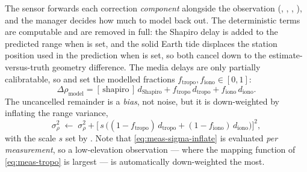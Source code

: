 The sensor forwards each correction \emph{component} alongside the observation
(, , ,
), and the manager decides how much to model back out. The
deterministic terms are computable and are removed in full: the Shapiro delay
is added to the predicted range when  is set, and the
solid Earth tide displaces the station position used in the prediction when
 is set, so both cancel down to the
estimate-versus-truth geometry difference. The media delays are only partially
calibratable, so  and
 set the modelled fractions
$f_\mathrm{tropo}, f_\mathrm{iono} \in [0,1]$:
\begin{equation}
  \Delta\rho_\mathrm{model}
  = [\,\text{shapiro}\,]\,d_\mathrm{Shapiro}
  + f_\mathrm{tropo}\,d_\mathrm{tropo}
  + f_\mathrm{iono}\,d_\mathrm{iono} .
  \label{eq:meas-model-corr}
\end{equation}
The uncancelled remainder is a \emph{bias}, not noise, but it is
down-weighted by inflating the range variance,
\begin{equation}
  \sigma_\rho^2 \;\leftarrow\; \sigma_\rho^2
  + \Big[\,s\,\big((1 - f_\mathrm{tropo})\,d_\mathrm{tropo}
      + (1 - f_\mathrm{iono})\,d_\mathrm{iono}\big)\Big]^2 ,
  \label{eq:meas-sigma-inflate}
\end{equation}
with the scale $s$ set by . Note that
\cref{eq:meas-sigma-inflate} is evaluated \emph{per measurement}, so a
low-elevation observation --- where the mapping function of
\cref{eq:meas-tropo} is largest --- is automatically down-weighted the most.

